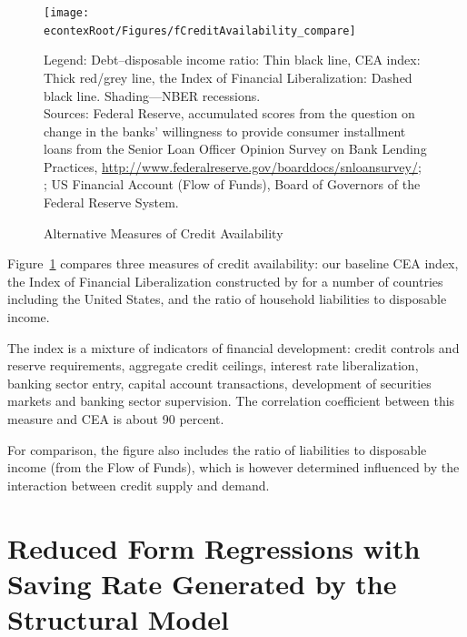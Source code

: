 \documentclass[titlepage]{\econtex}
\begin{document}
\hypertarget{fCreditAvailability}{}
\begin{figure}
\caption{Alternative Measures of Credit Availability \label{fCreditAvailability}}
\texttt{[image: \\econtexRoot/Figures/fCreditAvailability\_compare]}

\footnotesize
Legend: Debt--disposable income ratio: Thin black line, CEA index: Thick red/grey line, the \cite{abiadEtAl_FinReforms} Index of Financial Liberalization: Dashed black line. Shading---NBER recessions.\\[2mm]
\footnotesize Sources: Federal Reserve, accumulated scores from the question on change in the banks' willingness to provide consumer installment loans from the Senior Loan Officer Opinion Survey on Bank Lending Practices, \url{http://www.federalreserve.gov/boarddocs/snloansurvey/}; \cite{abiadEtAl_FinReforms}; US Financial Account (Flow of Funds), Board of Governors of the Federal Reserve System.
\end{figure}

Figure~\ref{fCreditAvailability} compares three measures of credit availability: our baseline CEA index, the Index of Financial Liberalization constructed by \cite{abiadEtAl_FinReforms} for a number of countries including the United States, and the ratio of household liabilities to disposable income.

The \citeauthor{abiadEtAl_FinReforms} index is a mixture of indicators of financial development: credit controls and reserve requirements, aggregate credit ceilings, interest rate liberalization, banking sector entry, capital account transactions, development of securities markets and banking sector supervision. The correlation coefficient between this measure and CEA is about 90 percent.

For comparison, the figure also includes the ratio of liabilities to disposable income (from the Flow of Funds), which is however determined influenced by the interaction between credit supply and demand.

\clearpage

\section{Reduced Form Regressions with Saving Rate Generated by the Structural Model}




\clearpage
\end{document}
